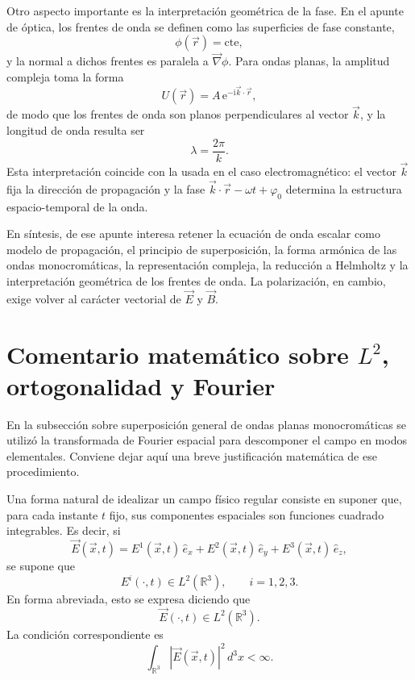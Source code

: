\documentclass[12pt,a4paper]{article}
\theoremstyle{definition}
\theoremstyle{plain}
\numberwithin{equation}{section}
\theoremstyle{remark}
\newcommand{\ii}{\mathrm{i}}
\newcommand{\ee}{\mathrm{e}}
\newcommand{\E}{\vec{E}}
\newcommand{\B}{\vec{B}}
\begin{document}
Otro aspecto importante es la interpretación geométrica de la fase. En el apunte de óptica, los frentes de onda se definen como las superficies de fase constante,
\begin{equation*}
    \phi(\vec r)=\text{cte},
\end{equation*}
y la normal a dichos frentes es paralela a $\vec\nabla\phi$. Para ondas planas, la amplitud compleja toma la forma
\begin{equation*}
    U(\vec r)=A\,\ee^{-\ii\vec k\cdot\vec r},
\end{equation*}
de modo que los frentes de onda son planos perpendiculares al vector $\vec k$, y la longitud de onda resulta ser
\begin{equation*}
    \lambda=\frac{2\pi}{k}.
\end{equation*}
Esta interpretación coincide con la usada en el caso electromagnético: el vector $\vec k$ fija la dirección de propagación y la fase $\vec k\cdot\vec r-\omega t+\varphi_0$ determina la estructura espacio-temporal de la onda.

En síntesis, de ese apunte interesa retener la ecuación de onda escalar como modelo de propagación, el principio de superposición, la forma armónica de las ondas monocromáticas, la representación compleja, la reducción a Helmholtz y la interpretación geométrica de los frentes de onda. La polarización, en cambio, exige volver al carácter vectorial de $\E$ y $\B$.


\section[Comentario matemático sobre L2, ortogonalidad y Fourier]{Comentario matemático sobre $L^2$, ortogonalidad y Fourier}
\label{ap:l2-fourier}

En la subsección sobre superposición general de ondas planas monocromáticas se utilizó la transformada de Fourier espacial para descomponer el campo en modos elementales. Conviene dejar aquí una breve justificación matemática de ese procedimiento.

Una forma natural de idealizar un campo físico regular consiste en suponer que, para cada instante $t$ fijo, sus componentes espaciales son funciones cuadrado integrables. Es decir, si
\begin{equation*}
    \vec E(\vec x,t)=E^1(\vec x,t)\,\hat e_x+E^2(\vec x,t)\,\hat e_y+E^3(\vec x,t)\,\hat e_z,
\end{equation*}
se supone que
\begin{equation*}
    E^i(\cdot,t)\in L^2(\mathbb R^3),\qquad i=1,2,3.
\end{equation*}
En forma abreviada, esto se expresa diciendo que
\begin{equation*}
    \vec E(\cdot,t)\in L^2(\mathbb R^3).
\end{equation*}
La condición correspondiente es
\begin{equation*}
    \int_{\mathbb R^3}|\vec E(\vec x,t)|^2\,d^3x<\infty.
\end{equation*}
\end{document}
